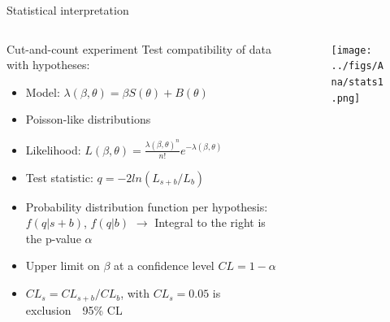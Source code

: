 \begin{frame}{Statistical interpretation}
\vspace{-.6cm}
\begin{columns}
\begin{column}{.50\textwidth}\tiny
\begin{block}{Cut-and-count experiment}\tiny
Test compatibility of data with hypotheses:
\begin{itemize}
\item Model: ${\lambda(\beta,\theta)=\beta S(\theta)+B(\theta)}$
\item Poisson-like distributions
\item Likelihood: $L(\beta,\theta)=\frac{\lambda(\beta,\theta)^{n}}{n!}e^{-\lambda(\beta,\theta)}$
\item Test statistic: $q=-2ln(L_{s+b}/L_{b})$
\item Probability distribution function per hypothesis: $f(q|s+b)$, $f(q|b)$ $\to$ Integral to the right is the p-value $\alpha$
\item Upper limit on $\beta$ at a confidence level $CL=1-\alpha$ 
\item $CL_{s}=CL_{s+b}/CL_{b}$, with $CL_{s}=0.05$ is exclusion~\MVAt~95\% CL 
\end{itemize}
\end{block}
\end{column}

\begin{column}{.50\textwidth}\tiny
\begin{figure}[!Hhtbp]
  \begin{center}
    \texttt{[image: ../figs/Ana/stats1.png]}
  \end{center}
\end{figure}
\end{column}

\end{columns}

\end{frame}

